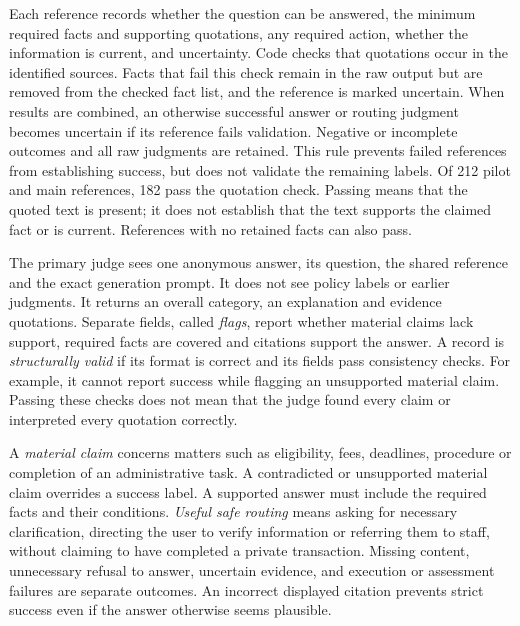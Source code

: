 \documentclass[a4paper,10pt,twocolumn]{article}
\begin{document}
Each reference records whether the question can be answered, the minimum required facts and supporting quotations, any required action, whether the information is current, and uncertainty. Code checks that quotations occur in the identified sources. Facts that fail this check remain in the raw output but are removed from the checked fact list, and the reference is marked uncertain. When results are combined, an otherwise successful answer or routing judgment becomes uncertain if its reference fails validation. Negative or incomplete outcomes and all raw judgments are retained. This rule prevents failed references from establishing success, but does not validate the remaining labels. Of 212 pilot and main references, 182 pass the quotation check. Passing means that the quoted text is present; it does not establish that the text supports the claimed fact or is current. References with no retained facts can also pass.

The primary judge sees one anonymous answer, its question, the shared reference and the exact generation prompt. It does not see policy labels or earlier judgments. It returns an overall category, an explanation and evidence quotations. Separate fields, called \emph{flags}, report whether material claims lack support, required facts are covered and citations support the answer. A record is \emph{structurally valid} if its format is correct and its fields pass consistency checks. For example, it cannot report success while flagging an unsupported material claim. Passing these checks does not mean that the judge found every claim or interpreted every quotation correctly.

A \emph{material claim} concerns matters such as eligibility, fees, deadlines, procedure or completion of an administrative task. A contradicted or unsupported material claim overrides a success label. A supported answer must include the required facts and their conditions. \emph{Useful safe routing} means asking for necessary clarification, directing the user to verify information or referring them to staff, without claiming to have completed a private transaction. Missing content, unnecessary refusal to answer, uncertain evidence, and execution or assessment failures are separate outcomes. An incorrect displayed citation prevents strict success even if the answer otherwise seems plausible.
\end{document}
